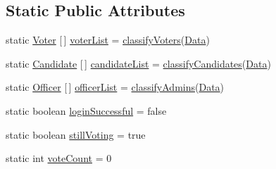 \subsection*{Static Public Attributes}
\begin{DoxyCompactItemize}
\item 
static \mbox{\hyperlink{classjsonbasedvoting_1_1_voter}{Voter}} \mbox{[}$\,$\mbox{]} \mbox{\hyperlink{classjsonbasedvoting_1_1_json_based_voting_a50b66e1d5c92322631fc26d0d607172e}{voter\+List}} = \mbox{\hyperlink{classjsonbasedvoting_1_1_json_based_voting_a6f76956192c5ec8d7704c20bcc967d91}{classify\+Voters}}(\mbox{\hyperlink{classjsonbasedvoting_1_1_json_based_voting_a2450ce5604c5512836d2739373c6245e}{Data}})
\item 
static \mbox{\hyperlink{classjsonbasedvoting_1_1_candidate}{Candidate}} \mbox{[}$\,$\mbox{]} \mbox{\hyperlink{classjsonbasedvoting_1_1_json_based_voting_aeb1c0154551e24a6fe24fc6b71576924}{candidate\+List}} = \mbox{\hyperlink{classjsonbasedvoting_1_1_json_based_voting_a09a09c0673c510a648d225136e4cf259}{classify\+Candidates}}(\mbox{\hyperlink{classjsonbasedvoting_1_1_json_based_voting_a2450ce5604c5512836d2739373c6245e}{Data}})
\item 
static \mbox{\hyperlink{classjsonbasedvoting_1_1_officer}{Officer}} \mbox{[}$\,$\mbox{]} \mbox{\hyperlink{classjsonbasedvoting_1_1_json_based_voting_a727f0bdc690e796c13428b4448be9456}{officer\+List}} = \mbox{\hyperlink{classjsonbasedvoting_1_1_json_based_voting_a8ae3b015105859acfa80cfcf3e481174}{classify\+Admins}}(\mbox{\hyperlink{classjsonbasedvoting_1_1_json_based_voting_a2450ce5604c5512836d2739373c6245e}{Data}})
\item 
static boolean \mbox{\hyperlink{classjsonbasedvoting_1_1_json_based_voting_af94e2555dca7bed41989b965a179a769}{login\+Successful}} = false
\item 
static boolean \mbox{\hyperlink{classjsonbasedvoting_1_1_json_based_voting_a560cc9720f1a7101b2e1cbdf2bbe7b76}{still\+Voting}} = true
\item 
static int \mbox{\hyperlink{classjsonbasedvoting_1_1_json_based_voting_a94c8b3fcebf88d5a739c9bc869160087}{vote\+Count}} = 0
\end{DoxyCompactItemize}
